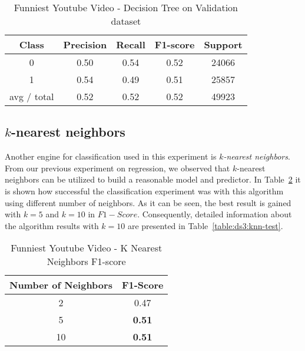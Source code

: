 \begin{table}[p]
\begin{center}
\begin{tabular}{|c|c|c|c|c|}
\hline Class & Precision & Recall & F1-score & Support \\

\hline 0 & 0.50 & 0.54 & 0.52 & 24066\\
\hline 1 & 0.54 & 0.49 & 0.51 & 25857\\
\hline avg / total & 0.52 & 0.52 & 0.52 & 49923\\
\hline
\end{tabular}

\caption{Funniest Youtube Video - Decision Tree on Validation dataset}
\label{table:db2:decisiontree-test}
\end{center}
\end{table}

\subsection{$k$-nearest neighbors}

Another engine for classification used in this experiment is {\it
$k$-nearest neighbors}. From our previous experiment on regression, we
observed that $k$-nearest neighbors can be utilized to build a reasonable model and
predictor. In Table~\ref{table:ds3:knn} it is shown how successful the
classification experiment was with this algorithm using different number of neighbors. As it 
can be seen, the best result is gained with $k=5$ and $k=10$ in $F1-Score$.
Consequently, detailed information about the algorithm results with $k=10$ are
presented in Table~\ref{table:ds3:knn-test}.


\begin{table}[p]
\begin{center}
\begin{tabular}{|c|c|}
\hline Number of Neighbors & F1-Score \\

\hline 2 & 0.47 \\
\hline 5 & {\bf 0.51} \\
\hline 10 & {\bf 0.51} \\

\hline
\end{tabular}

\caption{Funniest Youtube Video - K Nearest Neighbors  F1-score}
\label{table:ds3:knn}
\end{center}
\end{table}


